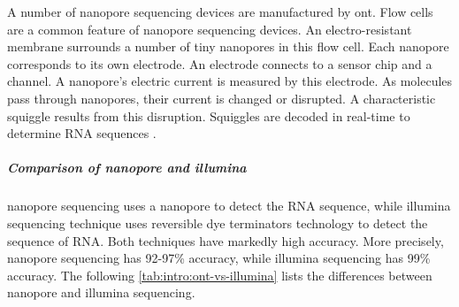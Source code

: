         A number of nanopore sequencing devices are manufactured by \acrlong{ont}. Flow cells are a common feature of \acrshort{nanopore} sequencing devices. An electro-resistant membrane surrounds a number of tiny nanopores in this flow cell. Each nanopore corresponds to its own electrode. An electrode connects to a sensor chip and a channel. A nanopore's electric current is measured by this electrode. As molecules pass through nanopores, their current is changed or disrupted. A characteristic squiggle results from this disruption. Squiggles are decoded in real-time to determine RNA sequences \cite{difference2021}. 
        
        \subparagraph{Comparison of \acrshort{nanopore} and \acrshort{illumina}} 
        \acrshort{nanopore} sequencing uses a nanopore to detect the RNA sequence, while \acrshort{illumina} sequencing technique uses reversible dye terminators technology to detect the sequence of RNA. Both techniques have markedly high accuracy. More precisely, \acrshort{nanopore} sequencing has 92-97\% accuracy, while \acrshort{illumina} sequencing has 99\% accuracy. The following \cref{tab:intro:ont-vs-illumina} lists the differences between \acrshort{nanopore} and \acrshort{illumina} sequencing.
        

